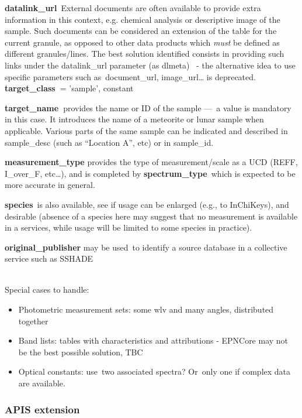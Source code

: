 \documentclass[11pt,a4paper]{ivoa}
\begin{document}
\textbf{datalink\_url} External documents are often available to provide extra information in this context, e.g. chemical analysis or descriptive image of the sample. Such documents can be considered an extension of the table for the current granule, as opposed to other data products which \emph{must} be defined as different granules/lines. The best solution identified consists in providing such links under the datalink\_url parameter (as dlmeta)  - the alternative idea to use specific parameters such as document\_url, image\_url… is deprecated.\\

\textbf{target\_class }= 'sample', constant

\textbf{target\_name }provides the name or ID of the sample — a value is mandatory in this case. It introduces the name of a meteorite or lunar sample when applicable. Various parts of the same sample can be indicated and described in sample\_desc (such as ``Location A'', etc) or in sample\_id.

\textbf{measurement\_type} provides the type of measurement/scale as a UCD (REFF, I\_over\_F, etc…), and is completed by \textbf{spectrum\_type} which is expected to be more accurate in general.

\textbf{species} is also available, see if usage can be enlarged (e.g., to InChiKeys), and desirable (absence of a species here may suggest that no measurement is available in a services, while usage will be limited to some species in practice).

\textbf{original\_publisher }may be used to identify a source database in a collective service such as SSHADE

\\

Special cases to handle:

\begin{itemize}
\item Photometric measurement sets: some wlv and many angles, distributed together
\item Band lists: tables with characteristics and attributions - EPNCore may not be the best possible solution, TBC
\item Optical constants: use two associated spectra? Or only one if complex data are available.
\end{itemize}

\subsubsection{APIS extension\\}
\end{document}

